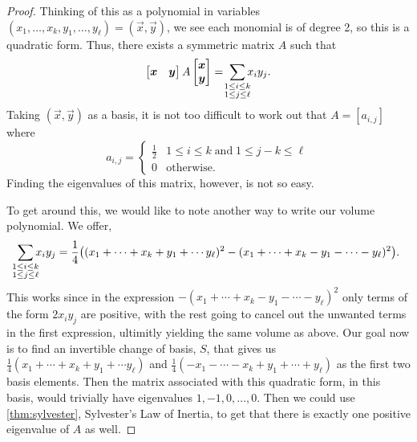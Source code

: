 \documentclass[12pt,oneside]{../../sfsuthesis}
\begin{document}
\begin{proof}
    Thinking of this as a polynomial in variables \( (x_1, \dots, x_k, y_1, \dots, y_\ell) = (\vec{x}, \vec{y}) \), we see each monomial is of degree 2, so this is a quadratic form.
    Thus, there exists a symmetric matrix \( A \) such that
    \[
        \begin{bmatrix}
            \vec{x} & \vec{y}
        \end{bmatrix}
        A
        \begin{bmatrix}
            \vec{x} \\ \vec{y}
        \end{bmatrix}
        = \; \sum_{\mathclap{\substack{1 \leq i \leq k \\ 1 \leq j \leq \ell}}} x_i y_j.
    \]
    Taking \( (\vec{x}, \vec{y}) \) as a basis, it is not too difficult to work out that \( A = [a_{i,j}] \) where
    \[
        a_{i,j} =
        \begin{cases}
            \frac{1}{2} & 1 \leq i \leq k \;\text{and} \; 1 \leq j - k \leq \ell \\
            0           & \text{otherwise}.
        \end{cases}
    \]
    Finding the eigenvalues of this matrix, however, is not so easy.

    To get around this, we would like to note another way to write our volume polynomial.
    We offer,
    \[
        \sum_{\mathclap{\substack{1 \leq i \leq k \\ 1 \leq j \leq \ell}}} x_i y_j
        = \frac{1}{4} \big((x_1 + \cdots + x_k + y_1 + \cdots y_\ell)^2 - (x_1 + \cdots + x_k - y_1 - \cdots - y_\ell)^2\big).
    \]
    This works since in the expression \( -(x_1 + \cdots + x_k - y_1 - \cdots - y_\ell)^2 \) only terms of the form \( 2x_i y_j \) are positive, with the rest going to cancel out the unwanted terms in the first expression, ultimitly yielding the same volume as above.
    Our goal now is to find an invertible change of basis, \( S \), that gives us \( \frac{1}{4}(x_1 + \cdots + x_k + y_1 + \cdots y_\ell) \) and \( \frac{1}{4}(-x_1 - \cdots - x_k + y_1 + \cdots + y_\ell) \) as the first two basis elements.
    Then the matrix associated with this quadratic form, in this basis, would trivially have eigenvalues \( 1, -1, 0, \dots, 0 \).
    Then we could use \th\ref{thm:sylvester}, Sylvester's Law of Inertia, to get that there is exactly one positive eigenvalue of \( A \) as well.


\end{proof}
\end{document}
